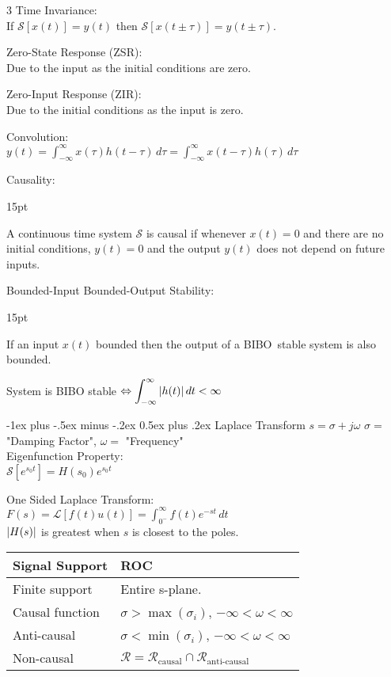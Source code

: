 \documentclass[12pt,landscape,letterpaper]{article}
\makeatletter
\renewcommand{\section}{\@startsection{section}{1}{0mm}%
                                {-1ex plus -.5ex minus -.2ex}%
                                {0.5ex plus .2ex}%
                                {\normalfont\normalsize\bfseries}}
\newcommand{\tab}{\hspace{0.02\textwidth}}
\newcommand{\ds}{\displaystyle}
\newenvironment{tabbed}
{
\vspace{-\parskip}
\begin{adjustwidth}{15pt}{}
}
{\end{adjustwidth}}
\makeatother
\begin{document}
\begin{multicols*}{3}
Time Invariance:\\
\tab If $\mathcal{S}[x(t)] = y(t)$ then $\mathcal{S}[x(t \pm \tau)] = y(t \pm \tau)$.

Zero-State Response (ZSR):\\
\tab Due to the input as the initial conditions are zero.

Zero-Input Response (ZIR):\\
\tab Due to the initial conditions as the input is zero.

Convolution:\\
\tab $\ds y(t) = \int_{-\infty}^{\infty}x(\tau)h(t-\tau)\,d\tau = \int_{-\infty}^{\infty}x(t-\tau)h(\tau)\,d\tau$

Causality:\\
\begin{tabbed}
A continuous time system $\mathcal{S}$ is causal if whenever $x(t) = 0$ and there are no initial conditions, $y(t) = 0$ and the output $y(t)$ does not depend on future inputs.
\end{tabbed}

Bounded-Input Bounded-Output Stability:\\
\begin{tabbed}
If an input $x(t)$ bounded then the output of a BIBO~stable system is also bounded.
\end{tabbed}
\tab System is BIBO stable $\Leftrightarrow \ds \int_{-\infty}^{\infty} \abs{h(t)}\,dt < \infty$

\section{Laplace Transform}
$s = \sigma + j\omega$ \quad $\sigma = $ "Damping Factor", $\omega = $ "Frequency"\\

Eigenfunction Property:\\
\tab $\mathcal{S}[e^{s_0t}] = H(s_0)e^{s_0t}$

One Sided Laplace Transform:\\
\tab $\ds F(s) = \mathcal{L}[f(t)u(t)] = \int_{0^-}^{\infty}f(t)e^{-st}\,dt$\\
\tab $\abs{H(s)}$ is greatest when $s$ is closest to the poles. %

\begin{tabular}{ll}
	\toprule
	Signal Support & ROC\\
	\midrule
	Finite support & Entire s-plane.\\
	Causal function & $\sigma > \max(\sigma_i)$,  $-\infty < \omega < \infty$\\
	Anti-causal & $\sigma < \min(\sigma_i)$,  $-\infty < \omega < \infty$\\
	Non-causal & $\mathcal{R} = \mathcal{R}_\text{causal} \cap \mathcal{R}_\text{anti-causal}$\\
	\bottomrule
\end{tabular}
\vspace{0.5em}


\end{multicols*}
\end{document}
